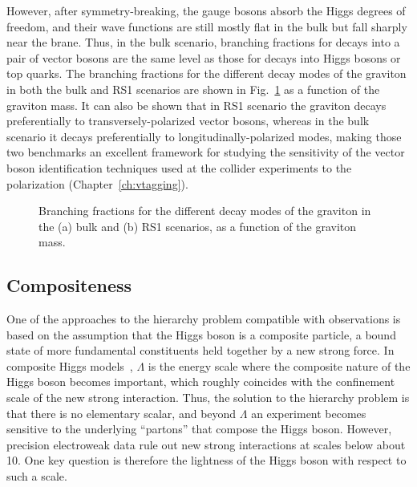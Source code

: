 However, after symmetry-breaking, the gauge bosons absorb the Higgs degrees of freedom, and their wave functions are still mostly flat in the bulk but fall sharply near the brane.
Thus, in the bulk scenario, branching fractions for decays into a pair of vector bosons are the same level as those for decays into Higgs bosons or top quarks.
The branching fractions for the different decay modes of the graviton in both the bulk and RS1 scenarios are shown in Fig.~\ref{fig:GrBR} as a function of the graviton mass.
It can also be shown that in RS1 scenario the graviton decays preferentially to transversely-polarized vector bosons, whereas in the bulk scenario it decays preferentially to longitudinally-polarized modes, making those two benchmarks an excellent framework for studying the sensitivity of the vector boson identification techniques used at the collider experiments to the polarization (Chapter~\ref{ch:vtagging}).

\begin{figure}[!htb]
\centering
{}
\caption{Branching fractions for the different decay modes of the graviton in the (a) bulk and (b) RS1 scenarios, as a function of the graviton mass.}
\label{fig:GrBR}
\end{figure}

\subsection{Compositeness}\label{subsec:composite}

One of the approaches to the hierarchy problem compatible with observations is based on the assumption that the Higgs boson is a composite particle, a bound state of more fundamental constituents held together by a new strong force.
In composite Higgs models~\cite{Composite0,Composite1,Composite2}, $\Lambda$ is the energy scale where the composite nature of the Higgs boson becomes important, which roughly coincides with the confinement scale of the new strong interaction. Thus, the solution to the hierarchy problem is that there is no elementary scalar, and beyond $\Lambda$ an experiment becomes sensitive to the underlying ``partons'' that compose the Higgs boson. 
However, precision electroweak data rule out new strong interactions at scales below about 10\TeV.
One key question is therefore the lightness of the Higgs boson with respect to such a scale.

